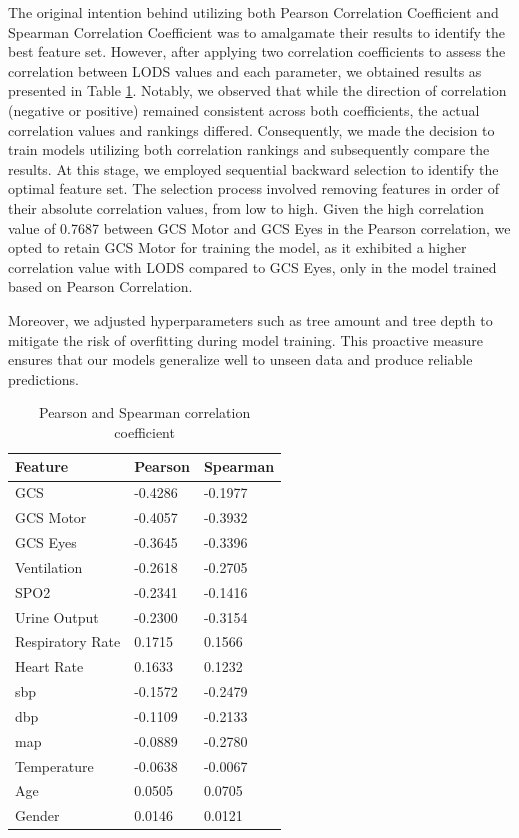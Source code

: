 \documentclass[12pt,a4paper,english
]{tunithesis}
\begin{document}
The original intention behind utilizing both Pearson Correlation Coefficient and Spearman Correlation Coefficient was to amalgamate their results to identify the best feature set. However, after applying two correlation coefficients to assess the correlation between LODS values and each parameter, we obtained results as presented in Table \ref{table:cc_value}. Notably, we observed that while the direction of correlation (negative or positive) remained consistent across both coefficients, the actual correlation values and rankings differed. Consequently, we made the decision to train models utilizing both correlation rankings and subsequently compare the results. At this stage, we employed sequential backward selection to identify the optimal feature set. The selection process involved removing features in order of their absolute correlation values, from low to high. Given the high correlation value of 0.7687 between GCS Motor and GCS Eyes in the Pearson correlation, we opted to retain GCS Motor for training the model, as it exhibited a higher correlation value with LODS compared to GCS Eyes, only in the model trained based on Pearson Correlation.

Moreover, we adjusted hyperparameters such as tree amount and tree depth to mitigate the risk of overfitting during model training. This proactive measure ensures that our models generalize well to unseen data and produce reliable predictions.

\begin{table}[]
\centering
    \caption{Pearson and Spearman correlation coefficient}
    \label{table:cc_value}
    \begin{tabular}{|l|l|l|}
        \hline
        \textbf{Feature} & \textbf{Pearson} & \textbf{Spearman} \\ \hline
            GCS & -0.4286 & -0.1977 \\ \hline
            GCS Motor & -0.4057 & -0.3932 \\ \hline
            GCS Eyes & -0.3645 & -0.3396 \\ \hline
            Ventilation & -0.2618 & -0.2705 \\ \hline
            SPO2 & -0.2341 & -0.1416 \\ \hline
            Urine Output & -0.2300 & -0.3154 \\ \hline
            Respiratory Rate & 0.1715 & 0.1566\\ \hline
            Heart Rate & 0.1633 & 0.1232 \\ \hline
            sbp & -0.1572 & -0.2479 \\ \hline
            dbp & -0.1109 & -0.2133 \\ \hline
            map & -0.0889 & -0.2780 \\ \hline
            Temperature & -0.0638 & -0.0067 \\ \hline
            Age & 0.0505 & 0.0705 \\ \hline
            Gender & 0.0146 & 0.0121 \\ \hline
    \end{tabular}
\end{table}
\end{document}
